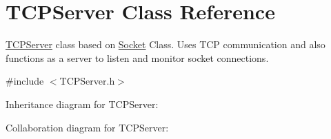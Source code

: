 \hypertarget{classTCPServer}{}\section{T\+C\+P\+Server Class Reference}
\label{classTCPServer}


\hyperlink{classTCPServer}{T\+C\+P\+Server} class based on \hyperlink{classSocket}{Socket} Class. Uses T\+CP communication and also functions as a server to listen and monitor socket connections.  




{\ttfamily \#include $<$T\+C\+P\+Server.\+h$>$}



Inheritance diagram for T\+C\+P\+Server\+:


Collaboration diagram for T\+C\+P\+Server\+:
